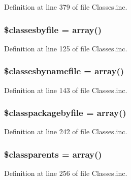 \-Definition at line 379 of file \-Classes.\-inc.

\hypertarget{class_classes_a2a2ff0e6f711ae176942be1d614972ad}{
\subsubsection[{\$classesbyfile}]{\setlength{\rightskip}{0pt plus 5cm}\$classesbyfile = array()}}\label{class_classes_a2a2ff0e6f711ae176942be1d614972ad}


\-Definition at line 125 of file \-Classes.\-inc.

\hypertarget{class_classes_a4fd38347c9554456653235bf3fa8afab}{
\subsubsection[{\$classesbynamefile}]{\setlength{\rightskip}{0pt plus 5cm}\$classesbynamefile = array()}}\label{class_classes_a4fd38347c9554456653235bf3fa8afab}


\-Definition at line 143 of file \-Classes.\-inc.

\hypertarget{class_classes_a5d9a6142abcf9fccff231de2fab31480}{
\subsubsection[{\$classpackagebyfile}]{\setlength{\rightskip}{0pt plus 5cm}\$classpackagebyfile = array()}}\label{class_classes_a5d9a6142abcf9fccff231de2fab31480}


\-Definition at line 242 of file \-Classes.\-inc.

\hypertarget{class_classes_afd4d2f82b7fd322ecacd8c92b876a10b}{
\subsubsection[{\$classparents}]{\setlength{\rightskip}{0pt plus 5cm}\$classparents = array()}}\label{class_classes_afd4d2f82b7fd322ecacd8c92b876a10b}


\-Definition at line 256 of file \-Classes.\-inc.

